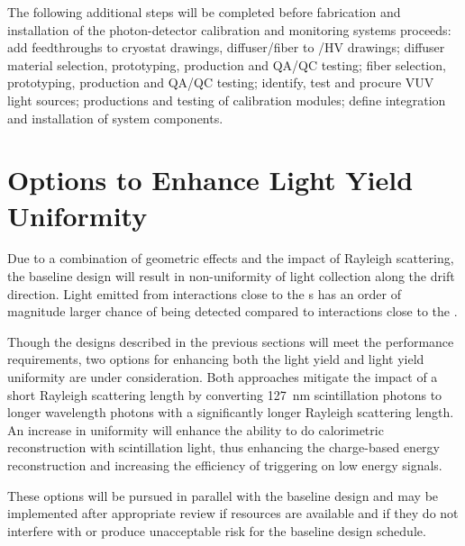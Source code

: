 The following additional steps will be completed before fabrication and installation of the photon-detector calibration and monitoring systems proceeds: add feedthroughs to cryostat drawings, diffuser/fiber to /HV drawings; diffuser material selection, prototyping, production and QA/QC testing; fiber selection, prototyping, production and QA/QC testing; identify, test and procure VUV light sources; productions and testing of calibration modules; define integration and installation of system components.



\section{Options to Enhance Light Yield Uniformity}
\label{sec:fdsp-pd-enh}
 
Due to a combination of geometric effects and the impact of Rayleigh scattering, the baseline  design will result in non-uniformity of light collection along the drift direction. Light emitted from interactions close to the s has an order of magnitude larger chance of being detected compared to interactions close to the . 

Though the designs described in the previous sections will meet the  performance requirements, %
two options for enhancing both the light yield and light yield uniformity are under consideration.  Both approaches mitigate the impact of a short Rayleigh scattering length by converting \SI{127}{nm} scintillation photons to longer wavelength photons with a significantly longer Rayleigh scattering length. %
An increase in uniformity %
will enhance the ability to do calorimetric reconstruction with scintillation light, %
thus enhancing the charge-based energy reconstruction %
and increasing the efficiency of triggering on low energy signals.

These options will be pursued in parallel with the baseline design and may be implemented after appropriate review if resources are available and if they do not interfere with or produce unacceptable risk for the baseline design schedule.



